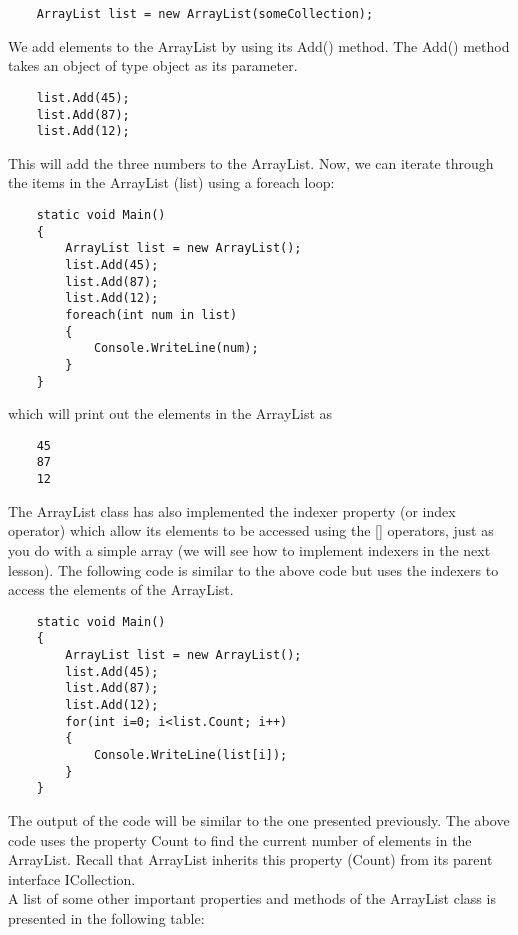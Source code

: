 \begin{lstlisting}
    ArrayList list = new ArrayList(someCollection);    
\end{lstlisting}

We add elements to the ArrayList by using its Add() method. The Add() method takes an object of type object as
its parameter.

\begin{lstlisting}
    list.Add(45);
    list.Add(87);
    list.Add(12);        
\end{lstlisting}

This will add the three numbers to the ArrayList. Now, we can iterate through the items in the ArrayList (list) using
a foreach loop:

\begin{lstlisting}
    static void Main()
    {
        ArrayList list = new ArrayList();
        list.Add(45);
        list.Add(87);
        list.Add(12);
        foreach(int num in list)
        {
            Console.WriteLine(num);
        }
    }    
\end{lstlisting}

which will print out the elements in the ArrayList as

\begin{lstlisting}
    45
    87
    12    
\end{lstlisting}


The ArrayList class has also implemented the indexer property (or index operator) which allow its elements to be
accessed using the [] operators, just as you do with a simple array (we will see how to implement indexers in the
next lesson). The following code is similar to the above code but uses the indexers to access the elements of the
ArrayList.

\begin{lstlisting}
    static void Main()
    {
        ArrayList list = new ArrayList();
        list.Add(45);
        list.Add(87);
        list.Add(12);
        for(int i=0; i<list.Count; i++)
        {
            Console.WriteLine(list[i]);
        }
    }    
\end{lstlisting}

The output of the code will be similar to the one presented previously. The above code uses the property Count to
find the current number of elements in the ArrayList. Recall that ArrayList inherits this property (Count) from its
parent interface ICollection.\\

A list of some other important properties and methods of the ArrayList class is presented in the following table:

